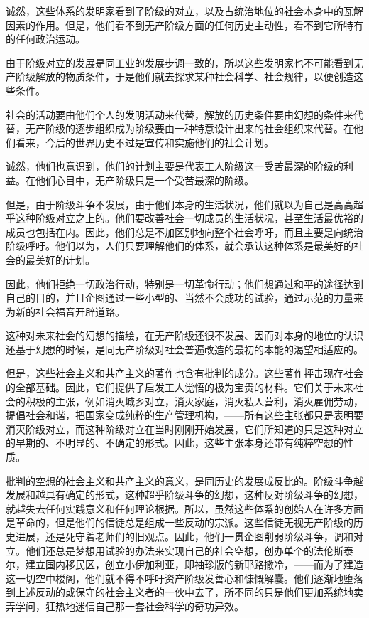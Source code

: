 \documentclass[10pt, UTF8]{book} %
\begin{document}
诚然，这些体系的发明家看到了阶级的对立，以及占统治地位的社会本身中的瓦解因素的作用。但是，他们看不到无产阶级方面的任何历史主动性，看不到它所特有的任何政治运动。

由于阶级对立的发展是同工业的发展步调一致的，所以这些发明家也不可能看到无产阶级解放的物质条件，于是他们就去探求某种社会科学、社会规律，以便创造这些条件。

社会的活动要由他们个人的发明活动来代替，解放的历史条件要由幻想的条件来代替，无产阶级的逐步组织成为阶级要由一种特意设计出来的社会组织来代替。在他们看来，今后的世界历史不过是宣传和实施他们的社会计划。

诚然，他们也意识到，他们的计划主要是代表工人阶级这一受苦最深的阶级的利益。在他们心目中，无产阶级只是一个受苦最深的阶级。

但是，由于阶级斗争不发展，由于他们本身的生活状况，他们就以为自己是高高超乎这种阶级对立之上的。他们要改善社会一切成员的生活状况，甚至生活最优裕的成员也包括在内。因此，他们总是不加区别地向整个社会呼吁，而且主要是向统治阶级呼吁。他们以为，人们只要理解他们的体系，就会承认这种体系是最美好的社会的最美好的计划。

因此，他们拒绝一切政治行动，特别是一切革命行动；他们想通过和平的途径达到自己的目的，并且企图通过一些小型的、当然不会成功的试验，通过示范的力量来为新的社会福音开辟道路。

这种对未来社会的幻想的描绘，在无产阶级还很不发展、因而对本身的地位的认识还基于幻想的时候，是同无产阶级对社会普遍改造的最初的本能的渴望相适应的。

但是，这些社会主义和共产主义的著作也含有批判的成分。这些著作抨击现存社会的全部基础。因此，它们提供了启发工人觉悟的极为宝贵的材料。它们关于未来社会的积极的主张，例如消灭城乡对立，消灭家庭，消灭私人营利，消灭雇佣劳动，提倡社会和谐，把国家变成纯粹的生产管理机构，——所有这些主张都只是表明要消灭阶级对立，而这种阶级对立在当时刚刚开始发展，它们所知道的只是这种对立的早期的、不明显的、不确定的形式。因此，这些主张本身还带有纯粹空想的性质。

批判的空想的社会主义和共产主义的意义，是同历史的发展成反比的。阶级斗争越发展和越具有确定的形式，这种超乎阶级斗争的幻想，这种反对阶级斗争的幻想，就越失去任何实践意义和任何理论根据。所以，虽然这些体系的创始人在许多方面是革命的，但是他们的信徒总是组成一些反动的宗派。这些信徒无视无产阶级的历史进展，还是死守着老师们的旧观点。因此，他们一贯企图削弱阶级斗争，调和对立。他们还总是梦想用试验的办法来实现自己的社会空想，创办单个的法伦斯泰尔，建立国内移民区，创立小伊加利亚，即袖珍版的新耶路撒冷，——而为了建造这一切空中楼阁，他们就不得不呼吁资产阶级发善心和慷慨解囊。他们逐渐地堕落到上述反动的或保守的社会主义者的一伙中去了，所不同的只是他们更加系统地卖弄学问，狂热地迷信自己那一套社会科学的奇功异效。
\end{document}
